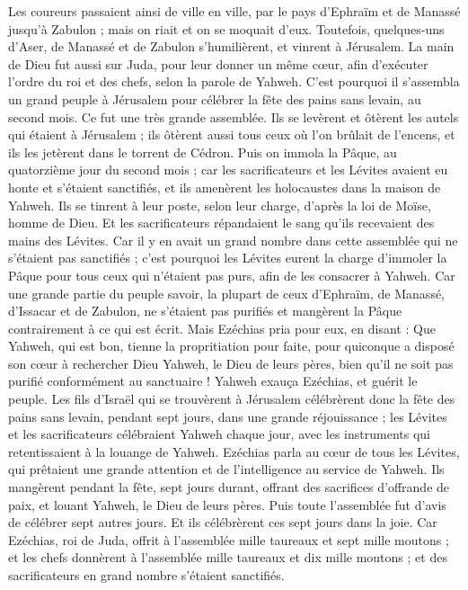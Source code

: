 \begin{multicols}{2}
Les coureurs passaient ainsi de ville en ville, par le pays d'Ephraïm et de Manassé jusqu'à Zabulon ; mais on riait et on se moquait d’eux.
Toutefois, quelques-uns d'Aser, de Manassé et de Zabulon s'humilièrent, et vinrent à Jérusalem.
La main de Dieu fut aussi sur Juda, pour leur donner un même cœur, afin d'exécuter l’ordre du roi et des chefs, selon la parole de Yahweh.
C'est pourquoi il s'assembla un grand peuple à Jérusalem pour célébrer la fête des pains sans levain, au second mois. Ce fut une très grande assemblée.
Ils se levèrent et ôtèrent les autels qui étaient à Jérusalem ; ils ôtèrent aussi tous ceux où l'on brûlait de l'encens, et ils les jetèrent dans le torrent de Cédron.
Puis on immola la Pâque, au quatorzième jour du second mois ; car les sacrificateurs et les Lévites avaient eu honte et s'étaient sanctifiés, et ils amenèrent les holocaustes dans la maison de Yahweh.
Ils se tinrent à leur poste, selon leur charge, d'après la loi de Moïse, homme de Dieu. Et les sacrificateurs répandaient le sang qu'ils recevaient des mains des Lévites.
Car il y en avait un grand nombre dans cette assemblée qui ne s'étaient pas sanctifiés ; c’est pourquoi les Lévites eurent la charge d'immoler la Pâque pour tous ceux qui n'étaient pas purs, afin de les consacrer à Yahweh.
Car une grande partie du peuple savoir, la plupart de ceux d'Ephraïm, de Manassé, d'Issacar et de Zabulon, ne s'étaient pas purifiés et mangèrent la Pâque contrairement à ce qui est écrit. Mais Ezéchias pria pour eux, en disant : Que Yahweh, qui est bon, tienne la propritiation pour faite,
pour quiconque a disposé son cœur à rechercher Dieu Yahweh, le Dieu de leurs pères, bien qu’il ne soit pas purifié conformément au sanctuaire !
Yahweh exauça Ezéchias, et guérit le peuple.
Les fils d’Israël qui se trouvèrent à Jérusalem célébrèrent donc la fête des pains sans levain, pendant sept jours, dans une grande réjouissance ; les Lévites et les sacrificateurs célébraient Yahweh chaque jour, avec les instruments qui retentissaient à la louange de Yahweh.
Ezéchias parla au cœur de tous les Lévites, qui prêtaient une grande attention et de l’intelligence au service de Yahweh. Ils mangèrent pendant la fête, sept jours durant, offrant des sacrifices d’offrande de paix, et louant Yahweh, le Dieu de leurs pères.
Puis toute l'assemblée fut d'avis de célébrer sept autres jours. Et ils célébrèrent ces sept jours dans la joie.
Car Ezéchias, roi de Juda, offrit à l'assemblée mille taureaux et sept mille moutons ; et les chefs donnèrent à l'assemblée mille taureaux et dix mille moutons ; et des sacrificateurs en grand nombre s'étaient sanctifiés.

\end{multicols}
